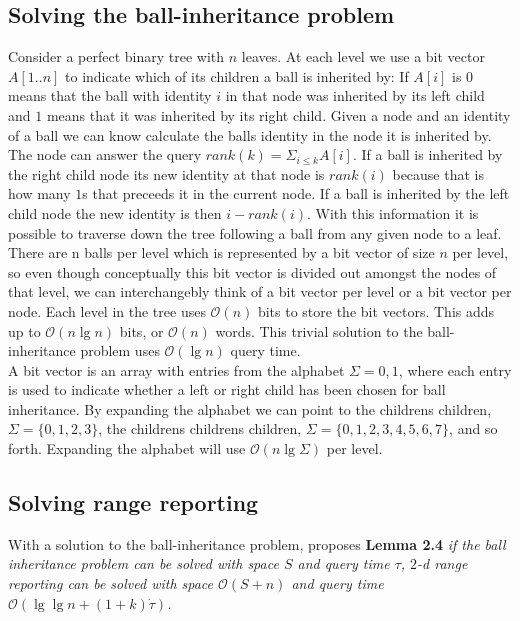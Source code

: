 \subsection{Solving the ball-inheritance problem} 
\label{ssection:solving-ball}

Consider a perfect binary tree with $n$ leaves. At each level we use a bit vector $A[1..n]$ to indicate which of its children a ball is inherited by: If $A[i]$ is $0$ means that the ball with identity $i$ in that node was inherited by its left child and $1$ means that it was inherited by its right child. Given a node and an identity of a ball we can know calculate the balls identity in the node it is inherited by. The node can answer the query $rank(k) = \Sigma_{i \leq k} A[i]$. If a ball is inherited by the right child node its new identity at that node is $rank(i)$ because that is how many $1$s that preceeds it in the current node. If a ball is inherited by the left child node the new identity is then $i-rank(i)$. With this information it is possible to traverse down the tree following a ball from any given node to a leaf. There are n balls per level which is represented by a bit vector of size $n$ per level, so even though conceptually this bit vector is divided out amongst the nodes of that level, we can interchangebly think of a bit vector per level or a bit vector per node. Each level in the tree uses $\mathcal{O}(n)$ bits to store the bit vectors. This adds up to $\mathcal{O}(n \lg n)$ bits, or $\mathcal{O}(n)$ words. This trivial solution to the ball-inheritance problem uses $\mathcal{O}(\lg n)$ query time. \\


A bit vector is an array with entries from the alphabet $\Sigma = {0,1}$, where each entry is used to indicate whether a left or right child has been chosen for ball inheritance. By expanding the alphabet we can point to the childrens children, $\Sigma = \{0,1,2,3\}$, the childrens childrens children, $\Sigma = \{0,1,2,3,4,5,6,7\}$, and so forth. Expanding the alphabet will use $\mathcal{O}(n \lg \Sigma)$ per level.


\subsection{Solving range reporting}
With a solution to the ball-inheritance problem, \citet{chanetal} proposes \textbf{Lemma 2.4} \emph{if the ball inheritance problem can be solved with space $S$ and query time $\tau$, $2$-d range reporting can be solved with space $\mathcal{O}(S+n)$ and query time $\mathcal{O}(\lg \lg n + (1+k) \dot \tau)$.}

